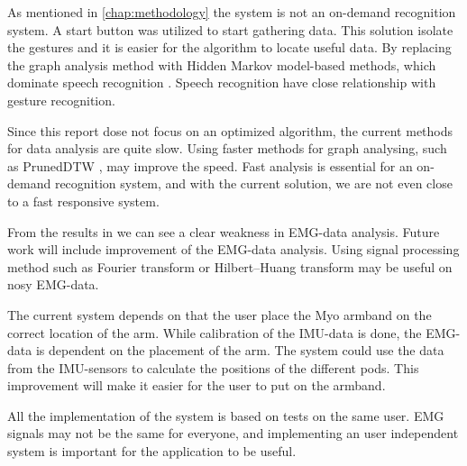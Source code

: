 \begin{description}[style=nextline]
    \item [Continuous Processing] As mentioned in \cref{chap:methodology} the system is not an on-demand recognition system. A start button was utilized to start gathering data. This solution isolate the gestures and it is easier for the algorithm to locate useful data. By replacing the graph analysis method with Hidden Markov model-based methods, which dominate speech recognition \cite{huang1990hidden}. Speech recognition have close relationship with gesture recognition.
    
    \item [Speed Optimization] Since this report dose not focus on an optimized algorithm, the current methods for data analysis are quite slow. Using faster methods for graph analysing, such as PrunedDTW \cite{silva2016speeding}, may improve the speed. Fast analysis is essential for an on-demand recognition system, and with the current solution, we are not even close to a fast responsive system. 
    
    \item [EMG-Analysis] From the results in  we can see a clear weakness in EMG-data analysis. Future work will include improvement of the EMG-data analysis. Using signal processing method such as Fourier transform or Hilbert–Huang transform may be useful on nosy EMG-data.
    
    \item [Position Aware] The current system depends on that the user place the Myo armband on the correct location of the arm. While calibration of the IMU-data is done, the EMG-data is dependent on the placement of the arm. The system could use the data from the IMU-sensors to calculate the positions of the different pods. This improvement will make it easier for the user to put on the armband.
    
    \item [User Independence] All the implementation of the system is based on tests on the same user. EMG signals may not be the same for everyone, and implementing an user independent system is important for the application to be useful.
    
\end{description}